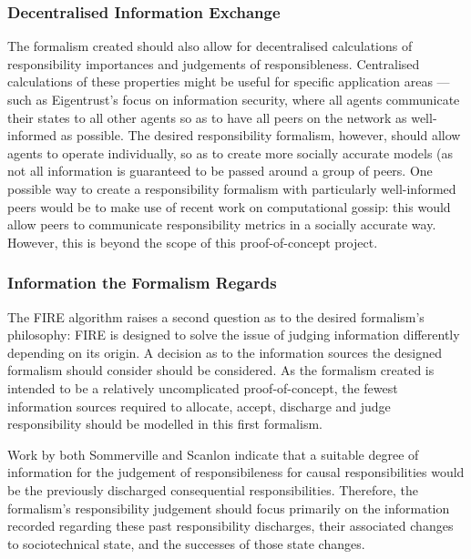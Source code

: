 \subsubsection{Decentralised Information Exchange}
The formalism created should also allow for decentralised calculations of responsibility importances and judgements of responsibleness. Centralised calculations of these properties might be useful for specific application areas --- such as Eigentrust's focus on information security, where all agents communicate their states to all other agents so as to have all peers on the network as well-informed as possible. The desired responsibility formalism, however, should allow agents to operate individually, so as to create more socially accurate models (as not all information is guaranteed to be passed around a group of peers. One possible way to create a responsibility formalism with particularly well-informed peers would be to make use of recent work on computational gossip\cite{Boyd2006,Lavaei2012}: this would allow peers to communicate responsibility metrics in a socially accurate way. However, this is beyond the scope of this proof-of-concept project.\par

\subsubsection{Information the Formalism Regards}
The FIRE algorithm raises a second question as to the desired formalism's philosophy: FIRE is designed to solve the issue of judging information differently depending on its origin. A decision as to the information sources the designed formalism should consider should be considered. As the formalism created is intended to be a relatively uncomplicated proof-of-concept, the fewest information sources required to allocate, accept, discharge and judge responsibility should be modelled in this first formalism.\par

Work by both Sommerville and Scanlon indicate that a suitable degree of information for the judgement of responsibileness for causal responsibilities would be the previously discharged consequential responsibilities. Therefore, the formalism's responsibility judgement should focus primarily on the information recorded regarding these past responsibility discharges, their associated changes to sociotechnical state, and the successes of those state changes.\par

